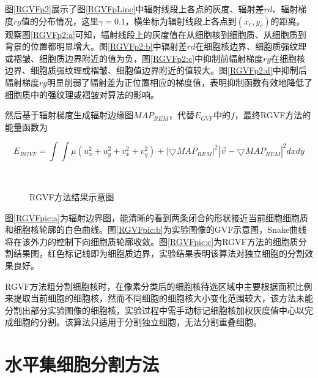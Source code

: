 \documentclass[nomlist,masters]{seuthesix}
\begin{document}
图\ref{RGVFp2}展示了图\ref{RGVFpLine}中辐射线段上各点的灰度、辐射差$rd$、辐射梯度$rg$值的分布情况，这里$\gamma=0.1$，横坐标为辐射线段上各点到$(x_{c},y_{c})$的距离。观察图\ref{RGVFp2:a}可知，辐射线段上的灰度值在从细胞核到细胞质、从细胞质到背景的位置都明显增大。图\ref{RGVFp2:b}中辐射差$rd$在细胞核边界、细胞质强纹理或褶皱、细胞质边界附近的值为负，图\ref{RGVFp2:c}中抑制前辐射梯度$rg$在细胞核边界、细胞质强纹理或褶皱、细胞值边界附近的值较大。图\ref{RGVFp2:d}中抑制后辐射梯度$rg$明显削弱了辐射差为正位置相应的梯度值，表明抑制函数有效地降低了细胞质中的强纹理或褶皱对算法的影响。

然后基于辐射梯度生成辐射边缘图$MAP_{REM}$，代替$E_{GVF}$中的$f$，最终RGVF方法的能量函数为

\begin{equation}
E_{RGVF}=\int\int \mu(u_{x}^{2}+u_{y}^{2}+v_{x}^{2}+v_{y}^{2})+\left | \bigtriangledown MAP_{REM} \right |^{2}\left | \vec{v}- \bigtriangledown MAP_{REM}\right |^{2}dxdy
\label{ERGVF}
\end{equation}

\begin{figure}[H]
\centering 
\hspace{0.01\textwidth}
\hspace{0.01\textwidth}
\caption{RGVF方法结果示意图}
\label{RGVFpic}
\end{figure}

图\ref{RGVFpic:a}为辐射边界图，能清晰的看到两条闭合的形状接近当前细胞细胞质和细胞核轮廓的白色曲线。图\ref{RGVFpic:b}为实验图像的GVF示意图，Snake曲线将在该外力的控制下向细胞质轮廓收敛。图\ref{RGVFpic:c}为RGVF方法的细胞质分割结果图，红色标记线即为细胞质边界，实验结果表明该算法对独立细胞的分割效果良好。

RGVF方法粗分割细胞核时，在像素分类后的细胞核待选区域中主要根据面积比例来提取当前细胞的细胞核，然而不同细胞的细胞核大小变化范围较大，该方法未能分割出部分实验图像的细胞核，实验过程中需手动标记细胞核加权灰度值中心以完成细胞的分割。该算法只适用于分割独立细胞，无法分割重叠细胞。

\section{水平集细胞分割方法}  
\end{document}
